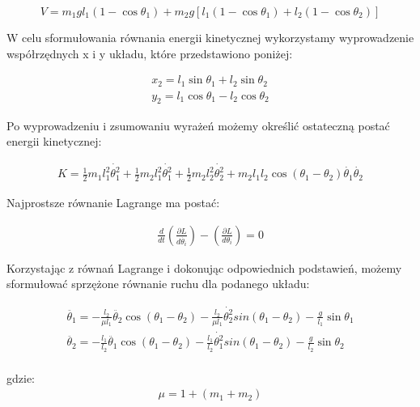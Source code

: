 \documentclass[a4paper,12pt,reqno]{article}
\begin{document}
\begin{equation} 
V=m_1gl_1(1-\cos\theta_1)+m_2g[l_1(1-\cos\theta_1)+l_2(1-\cos\theta_2)]
\end{equation}

W celu sformułowania równania energii kinetycznej wykorzystamy wyprowadzenie współrzędnych x i y układu, które przedstawiono poniżej:

\begin{equation}
\begin{split} 
x_2=l_1\sin\theta_1+l_2\sin\theta_2\\
y_2=l_1\cos\theta_1-l_2\cos\theta_2
\end{split}
\end{equation}

Po wyprowadzeniu i zsumowaniu wyrażeń możemy określić ostateczną postać energii kinetycznej:

\begin{equation}
\begin{split} 
K=\frac{1}{2}m_1l_1^2\dot{\theta_1^2}+\frac{1}{2}m_2l_1^2\dot{\theta_1^2}+\frac{1}{2}m_2l_2^2\dot{\theta_2^2}+m_2l_1l_2\cos(\theta_1-\theta_2)\dot{\theta_1}\dot{\theta_2}
\end{split}
\end{equation}


Najprostsze równanie Lagrange ma postać:

\begin{equation}
\begin{split} 
\frac{d}{dt}(\frac{\partial L}{d\dot{\theta_i}})-(\frac{\partial L}{d\theta_i})=0
\end{split}
\end{equation}

Korzystając z równań Lagrange i dokonując odpowiednich podstawień, możemy sformułować sprzężone równanie ruchu dla podanego układu:

\begin{equation}
\begin{split} 
\ddot{\theta_1}=-\frac{l_2}{\mu l_1} \ddot{\theta_2}\cos(\theta_1-\theta_2)-\frac{l_2}{\mu l_1}\dot{\theta_2^2} sin(\theta_1-\theta_2)-\frac{g}{l_1}\sin\theta_1\\
\ddot{\theta_2}=-\frac{l_1}{l_2} \ddot{\theta_1}\cos(\theta_1-\theta_2)-\frac{l_1}{l_2}\dot{\theta_1^2} sin(\theta_1-\theta_2)-\frac{g}{l_2}\sin\theta_2\\
\end{split}
\end{equation}

gdzie:
\begin{equation}
\begin{split} 
\mu=1+(m_1+m_2)
\end{split}
\end{equation}
\end{document}
